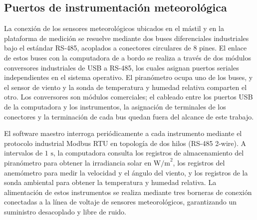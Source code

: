 \documentclass[../../General.tex]{subfiles}
\begin{document}
\subsection{Puertos de instrumentación meteorológica}\label{subsec:puertos_meteo}

La conexión de los sensores meteorológicos ubicados en el mástil y en la plataforma de medición se resuelve mediante dos buses diferenciales industriales bajo el estándar RS-485, acoplados a conectores circulares de 8 pines. El enlace de estos buses con la computadora de a bordo se realiza a través de dos módulos conversores industriales de USB a RS-485, los cuales asignan puertos seriales independientes en el sistema operativo.
El piranómetro ocupa uno de los buses, y el sensor de viento y la sonda de temperatura y humedad relativa comparten el otro. Los conversores son módulos comerciales; el cableado entre los puertos USB de la computadora y los instrumentos, la asignación de terminales de los conectores y la terminación de cada bus quedan fuera del alcance de este trabajo.

El software maestro interroga periódicamente a cada instrumento mediante el protocolo industrial Modbus RTU en topología de dos hilos (RS-485 2-wire). A intervalos de $1\text{ s}$, la computadora consulta los registros de almacenamiento del piranómetro para obtener la irradiancia solar en $\text{W/m}^2$, los registros del anemómetro para medir la velocidad y el ángulo del viento, y los registros de la sonda ambiental para obtener la temperatura y humedad relativa. La alimentación de estos instrumentos se realiza mediante tres borneras de conexión conectadas a la línea de voltaje de sensores meteorológicos, garantizando un suministro desacoplado y libre de ruido.
\end{document}
